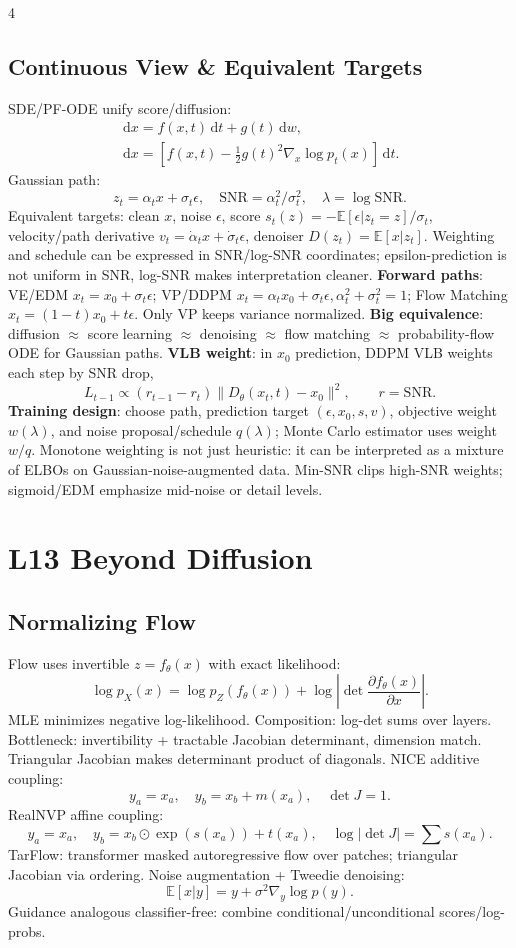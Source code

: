\documentclass[8pt,a4paper,landscape]{extarticle}
\newcommand{\key}[1]{\textbf{#1}}
\newcommand{\E}{\mathbb{E}}
\newcommand{\dd}{\,\mathrm{d}}
\begin{document}
\begin{multicols*}{4}
\subsection{Continuous View \& Equivalent Targets}
SDE/PF-ODE unify score/diffusion:
\[
\begin{gathered}
\dd x=f(x,t)\dd t+g(t)\dd w,\\
\dd x=\left[f(x,t)-\frac12g(t)^2\nabla_x\log p_t(x)\right]\dd t.
\end{gathered}
\]
Gaussian path:
\[
z_t=\alpha_t x+\sigma_t\epsilon,\quad \mathrm{SNR}=\alpha_t^2/\sigma_t^2,\quad \lambda=\log \mathrm{SNR}.
\]
Equivalent targets: clean $x$, noise $\epsilon$, score $s_t(z)=-\E[\epsilon|z_t=z]/\sigma_t$, velocity/path derivative $v_t=\dot\alpha_tx+\dot\sigma_t\epsilon$, denoiser $D(z_t)=\E[x|z_t]$. Weighting and schedule can be expressed in SNR/log-SNR coordinates; epsilon-prediction is not uniform in SNR, log-SNR makes interpretation cleaner.
\key{Forward paths}: VE/EDM $x_t=x_0+\sigma_t\epsilon$; VP/DDPM $x_t=\alpha_tx_0+\sigma_t\epsilon,\alpha_t^2+\sigma_t^2=1$; Flow Matching $x_t=(1-t)x_0+t\epsilon$. Only VP keeps variance normalized. \key{Big equivalence}: diffusion $\approx$ score learning $\approx$ denoising $\approx$ flow matching $\approx$ probability-flow ODE for Gaussian paths. \key{VLB weight}: in $x_0$ prediction, DDPM VLB weights each step by SNR drop,
\[
L_{t-1}\propto (r_{t-1}-r_t)\|D_\theta(x_t,t)-x_0\|^2,\qquad r=\mathrm{SNR}.
\]
\key{Training design}: choose path, prediction target $(\epsilon,x_0,s,v)$, objective weight $w(\lambda)$, and noise proposal/schedule $q(\lambda)$; Monte Carlo estimator uses weight $w/q$. Monotone weighting is not just heuristic: it can be interpreted as a mixture of ELBOs on Gaussian-noise-augmented data. Min-SNR clips high-SNR weights; sigmoid/EDM emphasize mid-noise or detail levels.

\section{L13 Beyond Diffusion}
\subsection{Normalizing Flow}
Flow uses invertible $z=f_\theta(x)$ with exact likelihood:
\[
\log p_X(x)=\log p_Z(f_\theta(x))+\log\left|\det\frac{\partial f_\theta(x)}{\partial x}\right|.
\]
MLE minimizes negative log-likelihood. Composition: log-det sums over layers. Bottleneck: invertibility + tractable Jacobian determinant, dimension match. Triangular Jacobian makes determinant product of diagonals. NICE additive coupling:
\[
y_a=x_a,\quad y_b=x_b+m(x_a),\quad \det J=1.
\]
RealNVP affine coupling:
\[
y_a=x_a,\quad y_b=x_b\odot\exp(s(x_a))+t(x_a),\quad \log|\det J|=\sum s(x_a).
\]
TarFlow: transformer masked autoregressive flow over patches; triangular Jacobian via ordering. Noise augmentation + Tweedie denoising:
\[
\E[x|y]=y+\sigma^2\nabla_y\log p(y).
\]
Guidance analogous classifier-free: combine conditional/unconditional scores/log-probs.


\end{multicols*}
\end{document}
